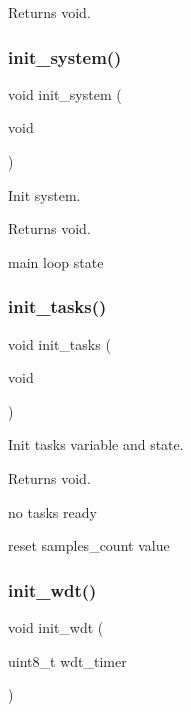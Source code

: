 \begin{DoxyReturn}{Returns}
void. 
\end{DoxyReturn}
\mbox{\label{i2c-th_8ino_afceb890a6ab9be73cc5481369538c705}} 
\subsubsection{\texorpdfstring{init\+\_\+system()}{init\_system()}}
{\footnotesize\ttfamily void init\+\_\+system (\begin{DoxyParamCaption}\item[{void}]{ }\end{DoxyParamCaption})}



Init system. 

\begin{DoxyReturn}{Returns}
void. 
\end{DoxyReturn}
main loop state \mbox{\label{i2c-th_8ino_ab4bf0a3d77da083f131d3fa35a37d2b1}} 
\subsubsection{\texorpdfstring{init\+\_\+tasks()}{init\_tasks()}}
{\footnotesize\ttfamily void init\+\_\+tasks (\begin{DoxyParamCaption}\item[{void}]{ }\end{DoxyParamCaption})}



Init tasks variable and state. 

\begin{DoxyReturn}{Returns}
void. 
\end{DoxyReturn}
no tasks ready

reset samples\+\_\+count value \mbox{\label{i2c-th_8ino_a980e73df66b14b1190bc25da430a4f12}} 
\subsubsection{\texorpdfstring{init\+\_\+wdt()}{init\_wdt()}}
{\footnotesize\ttfamily void init\+\_\+wdt (\begin{DoxyParamCaption}\item[{uint8\+\_\+t}]{wdt\+\_\+timer }\end{DoxyParamCaption})}




